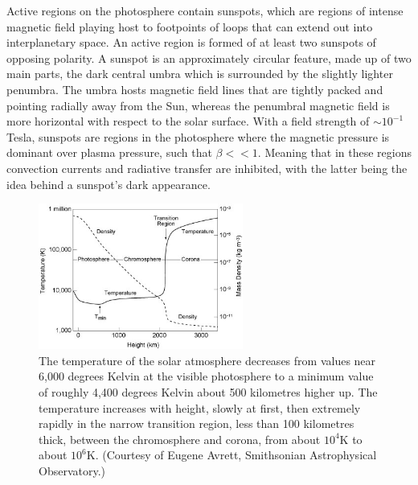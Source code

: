 Active regions on the photosphere contain sunspots, which are regions of intense magnetic field playing host to footpoints of loops that can extend out into interplanetary space. An active region is formed of at least two sunspots of opposing polarity. 
A sunspot is an approximately circular feature, made up of two main parts, the dark central umbra which is surrounded by the slightly lighter penumbra. The umbra hosts magnetic field lines that are tightly packed and pointing radially away from the Sun, whereas the penumbral magnetic field is more horizontal with respect to the solar surface. With a field strength of $\sim 10^{-1}$ Tesla, sunspots are regions in the photosphere where the magnetic pressure is dominant over plasma pressure, such that $\beta << 1$. Meaning that in these regions convection currents and radiative transfer are inhibited, with the latter being the idea behind a sunspot's dark appearance. \\



\begin{figure}[H]
  \begin{center}
    \includegraphics[width=0.6\textwidth]{solar-atm-plot}
\caption{The temperature of the solar atmosphere decreases from values near 6,000 degrees Kelvin at the visible photosphere to a minimum value of roughly 4,400 degrees Kelvin about 500 kilometres higher up. The temperature increases with height, slowly at first, then extremely rapidly in the narrow transition region, less than 100 kilometres thick, between the chromosphere and corona, from about $10^{4}$K to about $10^{6}$K. (Courtesy of Eugene Avrett, Smithsonian Astrophysical Observatory.)}\label{solatm}
  \end{center}
\end{figure}

